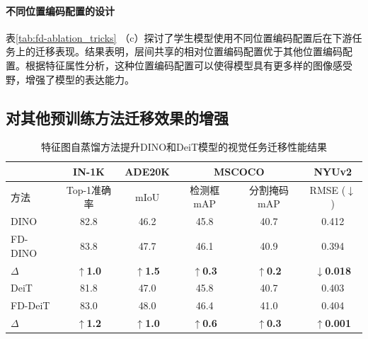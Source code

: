 \paragraph{不同位置编码配置的设计} 表\ref{tab:fd-ablation_tricks} （c）探讨了学生模型使用不同位置编码配置后在下游任务上的迁移表现。结果表明，层间共享的相对位置编码配置优于其他位置编码配置。根据特征属性分析，这种位置编码配置可以使得模型具有更多样的图像感受野，增强了模型的表达能力。

\subsection{对其他预训练方法迁移效果的增强}
\label{sec:fd-more-models}


\begin{table}
\caption{
特征图自蒸馏方法提升DINO和DeiT模型的视觉任务迁移性能结果
}
\centering
  \begin{tabular}{lccccc}
\toprule
   & IN-1K & ADE20K & \multicolumn{2}{c}{MSCOCO} & NYUv2 \\
   \midrule
方法    &  Top-1准确率   &  mIoU  & 检测框mAP & 分割掩码mAP & RMSE\scriptsize{ ($\downarrow$)}\\
  \midrule
  DINO & 82.8 & 46.2 & 45.8 & 40.7 & 0.412 \\
  FD-DINO & 83.8 & 47.7 & 46.1 & 40.9 & 0.394 \\
  $\Delta$ & \textbf{$\uparrow$1.0} & \textbf{$\uparrow$1.5} & \textbf{$\uparrow$0.3} & \textbf{$\uparrow$0.2} & \textbf{$\downarrow$0.018} \\
  \midrule
  
  DeiT & 81.8 & 47.0 & 45.8 & 40.7 & 0.403 \\
  FD-DeiT & 83.0 & 48.0 & 46.4 & 41.0 & 0.404 \\
  $\Delta$ & \textbf{$\uparrow$1.2} & \textbf{$\uparrow$1.0} & \textbf{$\uparrow$0.6} & \textbf{$\uparrow$0.3} & \textbf{$\uparrow$0.001} \\
\bottomrule
  \end{tabular}
\label{tab:fd-extend_dino_deit}
\end{table}

